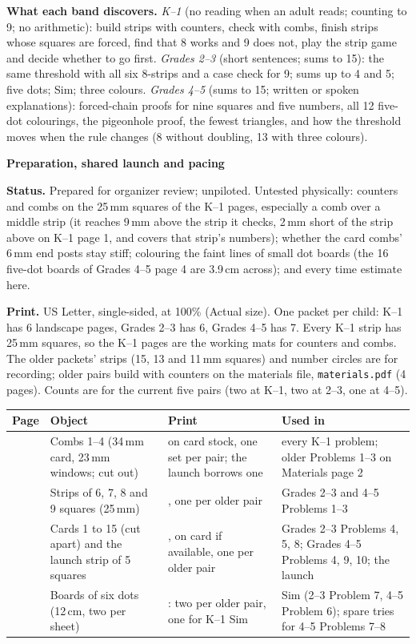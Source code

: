 \documentclass[11pt]{article}
\newcommand{\head}[1]{\par\needspace{8\baselineskip}\medskip\textbf{\large #1}\par}
\begin{document}
\textbf{What each band discovers.} \emph{K--1} (no reading when an adult reads; counting to 9; no arithmetic): build strips with counters, check with combs, finish strips whose squares are forced, find that 8 works and 9 does not, play the strip game and decide whether to go first. \emph{Grades 2--3} (short sentences; sums to 15): the same threshold with all six 8-strips and a case check for 9; sums up to 4 and 5; five dots; Sim; three colours. \emph{Grades 4--5} (sums to 15; written or spoken explanations): forced-chain proofs for nine squares and five numbers, all 12 five-dot colourings, the pigeonhole proof, the fewest triangles, and how the threshold moves when the rule changes (8 without doubling, 13 with three colours).

\head{Preparation, shared launch and pacing}
\textbf{Status.} Prepared for organizer review; unpiloted. Untested physically: counters and combs on the 25\,mm squares of the K--1 pages, especially a comb over a middle strip (it reaches 9\,mm above the strip it checks, 2\,mm short of the strip above on K--1 page 1, and covers that strip's numbers); whether the card combs' 6\,mm end posts stay stiff; colouring the faint lines of small dot boards (the 16 five-dot boards of Grades 4--5 page 4 are 3.9\,cm across); and every time estimate here.

\textbf{Print.} US Letter, single-sided, at 100\% (Actual size). One packet per child: K--1 has 6 landscape pages, Grades 2--3 has 6, Grades 4--5 has 7. Every K--1 strip has 25\,mm squares, so the K--1 pages are the working mats for counters and combs. The older packets' strips (15, 13 and 11\,mm squares) and number circles are for recording; older pairs build with counters on the materials file, \texttt{materials.pdf} (4 pages). Counts are for the current five pairs (two at K--1, two at 2--3, one at 4--5).

{\small\begin{tabular}{@{}>{\raggedright\arraybackslash}p{.06\linewidth}>{\raggedright\arraybackslash}p{.30\linewidth}>{\raggedright\arraybackslash}p{.26\linewidth}>{\raggedright\arraybackslash}p{.30\linewidth}@{}}\toprule
Page & Object & Print & Used in\\\midrule
1 & Combs 1--4 (34\,mm card, 23\,mm windows; cut out) & 5 on card stock, one set per pair; the launch borrows one & every K--1 problem; older Problems 1--3 on Materials page 2\\
2 & Strips of 6, 7, 8 and 9 squares (25\,mm) & 3, one per older pair & Grades 2--3 and 4--5 Problems 1--3\\
3 & Cards 1 to 15 (cut apart) and the launch strip of 5 squares & 3, on card if available, one per older pair & Grades 2--3 Problems 4, 5, 8; Grades 4--5 Problems 4, 9, 10; the launch\\
4 & Boards of six dots (12\,cm, two per sheet) & 7: two per older pair, one for K--1 Sim & Sim (2--3 Problem 7, 4--5 Problem 6); spare tries for 4--5 Problems 7--8\\\bottomrule
\end{tabular}}
\end{document}
